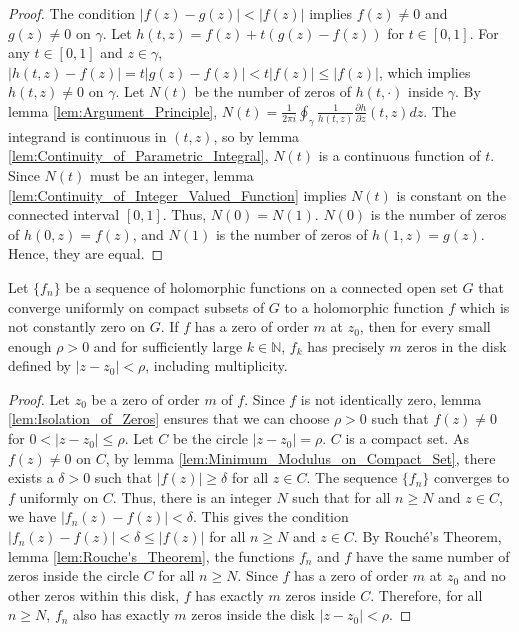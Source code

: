 \begin{proof}
    The condition $|f(z) - g(z)| < |f(z)|$ implies $f(z) \neq 0$ and $g(z) \neq 0$ on $\gamma$. Let $h(t, z) = f(z) + t(g(z)-f(z))$ for $t \in [0, 1]$. For any $t \in [0, 1]$ and $z \in \gamma$, $|h(t, z) - f(z)| = t|g(z)-f(z)| < t|f(z)| \le |f(z)|$, which implies $h(t,z) \neq 0$ on $\gamma$.
    Let $N(t)$ be the number of zeros of $h(t, \cdot)$ inside $\gamma$. By lemma \ref{lem:Argument_Principle}, $N(t) = \frac{1}{2\pi i} \oint_\gamma \frac{1}{h(t,z)}\frac{\partial h}{\partial z}(t,z) dz$. The integrand is continuous in $(t,z)$, so by lemma \ref{lem:Continuity_of_Parametric_Integral}, $N(t)$ is a continuous function of $t$. Since $N(t)$ must be an integer, lemma \ref{lem:Continuity_of_Integer_Valued_Function} implies $N(t)$ is constant on the connected interval $[0,1]$. Thus, $N(0) = N(1)$. $N(0)$ is the number of zeros of $h(0,z)=f(z)$, and $N(1)$ is the number of zeros of $h(1,z)=g(z)$. Hence, they are equal.
\end{proof}

\begin{theorem}
    \label{thm:Hurwitzs_Theorem}
    Let $\{f_n\}$ be a sequence of holomorphic functions on a connected open set $G$ that converge uniformly on compact subsets of $G$ to a holomorphic function $f$ which is not constantly zero on $G$. If $f$ has a zero of order $m$ at $z_0$, then for every small enough $\rho > 0$ and for sufficiently large $k \in \mathbb{N}$, $f_k$ has precisely $m$ zeros in the disk defined by $|z - z_0| < \rho$, including multiplicity.
\end{theorem}

\begin{proof}
    Let $z_0$ be a zero of order $m$ of $f$. Since $f$ is not identically zero, lemma \ref{lem:Isolation_of_Zeros} ensures that we can choose $\rho > 0$ such that $f(z) \neq 0$ for $0 < |z-z_0| \le \rho$. Let $C$ be the circle $|z-z_0| = \rho$. $C$ is a compact set.
    As $f(z) \neq 0$ on $C$, by lemma \ref{lem:Minimum_Modulus_on_Compact_Set}, there exists a $\delta > 0$ such that $|f(z)| \ge \delta$ for all $z \in C$.
    The sequence $\{f_n\}$ converges to $f$ uniformly on $C$. Thus, there is an integer $N$ such that for all $n \ge N$ and $z \in C$, we have $|f_n(z) - f(z)| < \delta$.
    This gives the condition $|f_n(z) - f(z)| < \delta \le |f(z)|$ for all $n \ge N$ and $z \in C$.
    By Rouché's Theorem, lemma \ref{lem:Rouche's_Theorem}, the functions $f_n$ and $f$ have the same number of zeros inside the circle $C$ for all $n \ge N$.
    Since $f$ has a zero of order $m$ at $z_0$ and no other zeros within this disk, $f$ has exactly $m$ zeros inside $C$. Therefore, for all $n \ge N$, $f_n$ also has exactly $m$ zeros inside the disk $|z-z_0|<\rho$.
\end{proof}